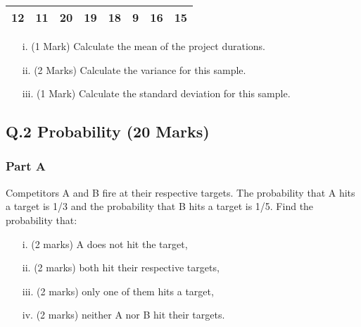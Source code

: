 \documentclass[a4paper,12pt]{article}
\begin{document}
\begin{table}[ht]
\begin{center}
\begin{tabular}{|rrrrrrrr|}

\hline
12 & 11 & 20 & 19 & 18 & 9 & 16 & 15 \\
\hline
\end{tabular}
\end{center}
\end{table}
\vspace{-0.5cm}


\begin{itemize}
\item[i.](1 Mark) Calculate the mean of the project durations.
\item[ii.](2 Marks) Calculate the variance for this sample.
\item[iii.](1 Mark) Calculate the standard deviation for this sample.
\end{itemize}





%

\newpage
\subsection*{Q.2 Probability (20 Marks)}
\subsubsection*{Part A}
Competitors A and B fire at their respective targets. The probability that A hits a target is 1/3 and the probability that B hits a target is 1/5. Find the probability that:
\begin{itemize}
\item[i.] (2 marks) A does not hit the target,
\item[ii.](2 marks)  both hit their respective targets,
\item[iii.](2 marks)  only one of them hits a target,
\item[iv.](2 marks) neither A nor B hit their targets.
\end{itemize}
\end{document}

